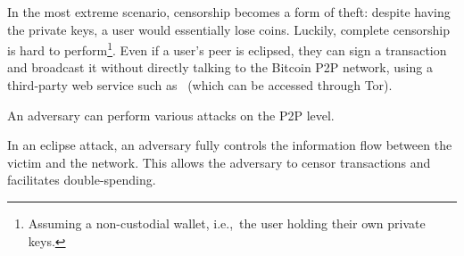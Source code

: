 In the most extreme scenario, censorship becomes a form of theft: despite having the private keys, a user would essentially lose coins.
Luckily, complete censorship is hard to perform\footnote{Assuming a non-custodial wallet, i.e.,~the user holding their own private keys.}.
Even if a user's peer is eclipsed, they can sign a transaction and broadcast it without directly talking to the Bitcoin P2P network, using a third-party web service such as~\cite{Blockstream} (which can be accessed through Tor).


An adversary can perform various attacks on the P2P level.

In an eclipse attack, an adversary fully controls the information flow between the victim and the network.
This allows the adversary to censor transactions and facilitates double-spending.



\fi